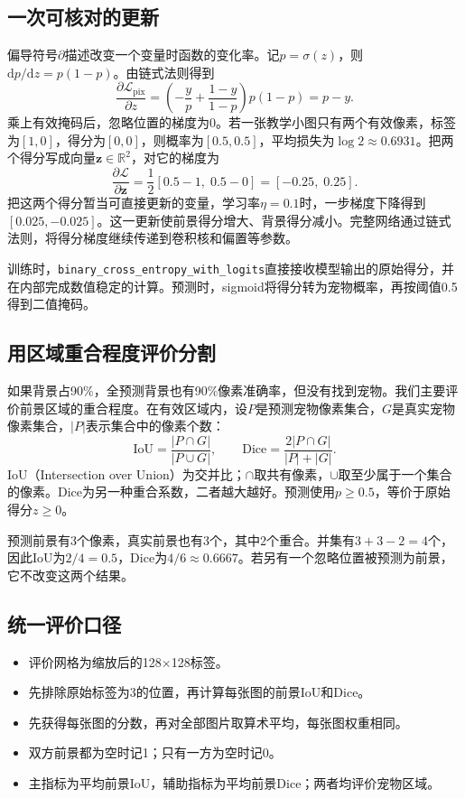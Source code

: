 \documentclass[UTF8,a4paper,11pt,fontset=fandol]{ctexart}
\newcommand{\file}[1]{\nolinkurl{#1}}
\begin{document}
\subsection{一次可核对的更新}
偏导符号$\partial$描述改变一个变量时函数的变化率。记$p=\sigma(z)$，则$\mathrm dp/\mathrm dz=p(1-p)$。由链式法则得到
\begin{equation}
\frac{\partial\mathcal L_{\mathrm{pix}}}{\partial z}
=\left(-\frac yp+\frac{1-y}{1-p}\right)p(1-p)=p-y.
\end{equation}
乘上有效掩码后，忽略位置的梯度为0。若一张教学小图只有两个有效像素，标签为$[1,0]$，得分为$[0,0]$，则概率为$[0.5,0.5]$，平均损失为$\log2\approx0.6931$。把两个得分写成向量$\mathbf z\in\mathbb R^2$，对它的梯度为
\begin{equation}
\frac{\partial\mathcal L}{\partial\mathbf z}
=\frac12[0.5-1,\;0.5-0]=[-0.25,\;0.25].
\end{equation}
把这两个得分暂当可直接更新的变量，学习率$\eta=0.1$时，一步梯度下降得到$[0.025,-0.025]$。这一更新使前景得分增大、背景得分减小。完整网络通过链式法则，将得分梯度继续传递到卷积核和偏置等参数。
\begin{keybox}[得分、概率与预测掩码]
训练时，\file{binary_cross_entropy_with_logits}直接接收模型输出的原始得分，并在内部完成数值稳定的计算。预测时，sigmoid将得分转为宠物概率，再按阈值0.5得到二值掩码。
\end{keybox}
\clearpage

\subsection{用区域重合程度评价分割}
如果背景占90\%，全预测背景也有90\%像素准确率，但没有找到宠物。我们主要评价前景区域的重合程度。在有效区域内，设$P$是预测宠物像素集合，$G$是真实宠物像素集合，$|P|$表示集合中的像素个数：
\begin{equation}
\mathrm{IoU}=\frac{|P\cap G|}{|P\cup G|},\qquad
\mathrm{Dice}=\frac{2|P\cap G|}{|P|+|G|}.
\end{equation}
IoU（Intersection over Union）为交并比；$\cap$取共有像素，$\cup$取至少属于一个集合的像素。Dice为另一种重合系数，二者越大越好。预测使用$p\geq0.5$，等价于原始得分$z\geq0$。
\begin{examplebox}[手算评价]
预测前景有3个像素，真实前景也有3个，其中2个重合。并集有$3+3-2=4$个，因此IoU为$2/4=0.5$，Dice为$4/6\approx0.6667$。若另有一个忽略位置被预测为前景，它不改变这两个结果。
\end{examplebox}
\subsection{统一评价口径}
\begin{itemize}
\item 评价网格为缩放后的128$\times$128标签。
\item 先排除原始标签为3的位置，再计算每张图的前景IoU和Dice。
\item 先获得每张图的分数，再对全部图片取算术平均，每张图权重相同。
\item 双方前景都为空时记1；只有一方为空时记0。
\item 主指标为平均前景IoU，辅助指标为平均前景Dice；两者均评价宠物区域。
\end{itemize}
\end{document}
